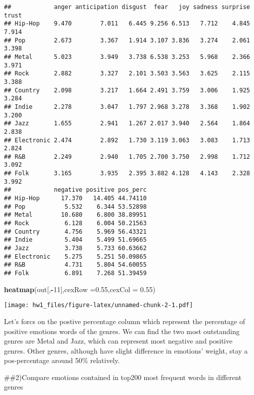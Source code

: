 \documentclass[]{article}
\newenvironment{Shaded}{\begin{snugshade}}{\end{snugshade}}
\newcommand{\DataTypeTok}[1]{\textcolor[rgb]{0.13,0.29,0.53}{#1}}
\newcommand{\DecValTok}[1]{\textcolor[rgb]{0.00,0.00,0.81}{#1}}
\newcommand{\FloatTok}[1]{\textcolor[rgb]{0.00,0.00,0.81}{#1}}
\newcommand{\KeywordTok}[1]{\textcolor[rgb]{0.13,0.29,0.53}{\textbf{#1}}}
\newcommand{\NormalTok}[1]{#1}
\newcommand{\OperatorTok}[1]{\textcolor[rgb]{0.81,0.36,0.00}{\textbf{#1}}}
\begin{document}
\begin{verbatim}
##            anger anticipation disgust  fear   joy sadness surprise trust
## Hip-Hop    9.470        7.011   6.445 9.256 6.513   7.712    4.845 7.914
## Pop        2.673        3.367   1.914 3.107 3.836   3.274    2.061 3.398
## Metal      5.023        3.949   3.738 6.538 3.253   5.968    2.366 3.971
## Rock       2.882        3.327   2.101 3.503 3.563   3.625    2.115 3.388
## Country    2.098        3.217   1.664 2.491 3.759   3.006    1.925 3.284
## Indie      2.278        3.047   1.797 2.968 3.278   3.368    1.902 3.200
## Jazz       1.655        2.941   1.267 2.017 3.940   2.564    1.864 2.838
## Electronic 2.474        2.892   1.730 3.119 3.063   3.083    1.713 2.824
## R&B        2.249        2.940   1.705 2.700 3.750   2.998    1.712 3.092
## Folk       3.165        3.935   2.395 3.882 4.128   4.143    2.328 3.992
##            negative positive pos_perc
## Hip-Hop      17.370   14.405 44.74110
## Pop           5.532    6.344 53.52898
## Metal        10.680    6.800 38.89951
## Rock          6.128    6.004 50.21563
## Country       4.756    5.969 56.43321
## Indie         5.404    5.499 51.69665
## Jazz          3.738    5.733 60.63662
## Electronic    5.275    5.251 50.09865
## R&B           4.731    5.804 54.60055
## Folk          6.891    7.268 51.39459
\end{verbatim}

\begin{Shaded}
\begin{Highlighting}[]
\KeywordTok{heatmap}\NormalTok{(out[,}\OperatorTok{-}\DecValTok{11}\NormalTok{],}\DataTypeTok{cexRow =}\FloatTok{0.55}\NormalTok{,}\DataTypeTok{cexCol =} \FloatTok{0.55}\NormalTok{)}
\end{Highlighting}
\end{Shaded}

\texttt{[image: hw1\_files/figure-latex/unnamed-chunk-2-1.pdf]}

Let's forcs on the postive percentage column which represent the
percentage of positive emotions words of the genres. We can find the two
most outstanding genres are Metal and Jazz, which can represent most
negative and positive genres. Other genres, although have slight
difference in emotions' weight, stay a pos-percentage around 50\%
relatively.

\#\#2)Compare emotions contained in top200 most frequent words in
different genres
\end{document}
